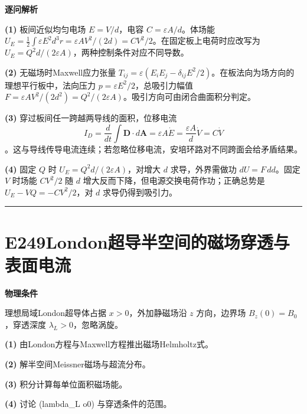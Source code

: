\documentclass[UTF8,a4paper,11pt,oneside,openany]{ctexbook}
\begin{document}
\par\medskip\noindent\textbf{逐问解析}
\par\noindent\textbf{(1)} 板间近似均匀电场 \(E=V/d\)，电容 \(C=\varepsilon A/d\)。体场能 \(U_E=\frac12\int\varepsilon E^2d^3r=\varepsilon AV^2/(2d)=CV^2/2\)。在固定板上电荷时应改写为 \(U_E=Q^2d/(2\varepsilon A)\)，两种控制条件对应不同导数。
\par\noindent\textbf{(2)} 无磁场时Maxwell应力张量 \(T_{ij}=\varepsilon(E_iE_j-\delta_{ij}E^2/2)\)。在板法向为场方向的理想平行板中，法向压力 \(p=\varepsilon E^2/2\)，总吸引力幅值 \(F=\varepsilon AV^2/(2d^2)=Q^2/(2\varepsilon A)\)。吸引方向可由闭合曲面积分判定。
\par\noindent\textbf{(3)} 穿过板间任一跨越两导线的面积，位移电流 \[I_D=\frac{d}{dt}\int\boldsymbol D\cdot d\boldsymbol A=\varepsilon A\dot E=\frac{\varepsilon A}{d}\dot V=C\dot V\]。这与导线传导电流连续；若忽略位移电流，安培环路对不同跨面会给矛盾结果。
\par\noindent\textbf{(4)} 固定 \(Q\) 时 \(U_E=Q^2d/(2\varepsilon A)\)，对增大 \(d\) 求导，外界需做功 \(dU=F\,dd\)。固定 \(V\) 时场能 \(CV^2/2\) 随 \(d\) 增大反而下降，但电源交换电荷作功；正确总势是 \(U_E-VQ=-CV^2/2\)，对 \(d\) 求导仍得到吸引力。

\par\bigskip\hrule\bigskip
\section*{E249\quad London超导半空间的磁场穿透与表面电流}
\textbf{物理条件}\par 理想局域London超导体占据 \(x>0\)，外加静磁场沿 \(z\) 方向，边界场 \(B_z(0)=B_0\)，穿透深度 \(\lambda_L>0\)，忽略涡旋。
\par\noindent\textbf{(1)} 由London方程与Maxwell方程推出磁场Helmholtz式。
\par\noindent\textbf{(2)} 解半空间Meissner磁场与超流分布。
\par\noindent\textbf{(3)} 积分计算每单位面积磁场能。
\par\noindent\textbf{(4)} 讨论 (lambda\_L	o0) 与穿透条件的范围。
\end{document}
